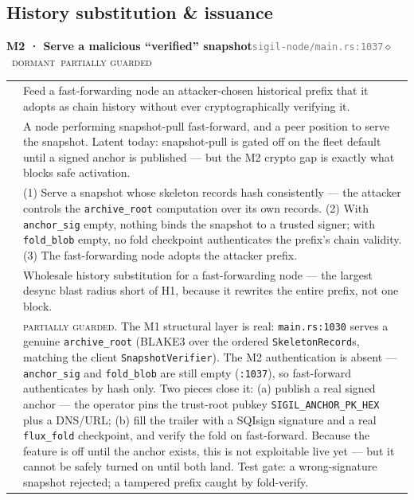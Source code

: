 \documentclass[10pt,a4paper]{article}
\makeatletter
\newcommand{\stD}{\textcolor{sigilviolet}{$\diamond$}~{\scriptsize\textcolor{sigilviolet}{\textsc{dormant}}}}
\newcommand{\svM}{{\scriptsize\textcolor{sigilamber}{\textsc{major}}}}
\newcommand{\mgPartial}{{\scriptsize\textcolor{sigilviolet}{\textsc{partially guarded}}}}
\newcommand{\frow}[2]{{\footnotesize\textcolor{gray}{\textsc{#1}}}\;&\small #2\\}
\newenvironment{atkentry}[5]{%
\begin{tcolorbox}[enhanced,breakable,colback=white,colframe=slate,boxrule=0.6pt,arc=2pt,
  left=8pt,right=8pt,top=6pt,bottom=6pt,
  borderline west={3pt}{0pt}{sigilred!60!slate}]
{\small\textbf{#1 · #2}\hfill{\footnotesize\textcolor{gray}{\texttt{#3}}}\quad#4\quad#5}\\[4pt]
\begin{tabular}{@{}>{\raggedleft\arraybackslash}p{2.1cm}p{12.9cm}@{}}
}{%
\end{tabular}
\end{tcolorbox}\vspace{2pt}}
\makeatother
\begin{document}
\subsection{History substitution \& issuance}

\begin{atkentry}{M2}{Serve a malicious ``verified'' snapshot}{sigil-node/main.rs:1037}{\svM}{\stD~\mgPartial}
\frow{goal}{Feed a fast-forwarding node an attacker-chosen historical prefix that it
adopts as chain history without ever cryptographically verifying it.}
\frow{preconditions}{A node performing snapshot-pull fast-forward, and a peer position to
serve the snapshot. Latent today: snapshot-pull is gated off on the fleet default until a
signed anchor is published — but the M2 crypto gap is exactly what blocks safe activation.}
\frow{steps}{(1) Serve a snapshot whose skeleton records hash consistently — the attacker
controls the \texttt{archive\_root} computation over its own records. (2) With
\texttt{anchor\_sig} empty, nothing binds the snapshot to a trusted signer; with
\texttt{fold\_blob} empty, no fold checkpoint authenticates the prefix's chain validity.
(3) The fast-forwarding node adopts the attacker prefix.}
\frow{buys}{Wholesale history substitution for a fast-forwarding node — the largest desync
blast radius short of H1, because it rewrites the entire prefix, not one block.}
\frow{defense}{\mgPartial{}. The M1 structural layer is real: \texttt{main.rs:1030} serves
a genuine \texttt{archive\_root} (BLAKE3 over the ordered \texttt{SkeletonRecord}s, matching
the client \texttt{SnapshotVerifier}). The M2 authentication is absent —
\texttt{anchor\_sig} and \texttt{fold\_blob} are still empty (\texttt{:1037}), so
fast-forward authenticates by hash only. Two pieces close it: (a) publish a real signed
anchor — the operator pins the trust-root pubkey \texttt{SIGIL\_ANCHOR\_PK\_HEX} plus a
DNS/URL; (b) fill the trailer with a SQIsign signature and a real \texttt{flux\_fold}
checkpoint, and verify the fold on fast-forward. Because the feature is off until the
anchor exists, this is not exploitable live yet — but it cannot be safely turned on until
both land. Test gate: a wrong-signature snapshot rejected; a tampered prefix caught by
fold-verify.}
\end{atkentry}
\end{document}
